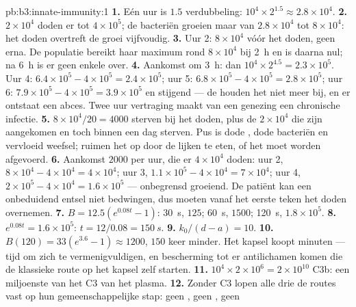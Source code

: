 \begin{solution}{pb:b3:innate-immunity:1}
\textbf{1.} Eén uur is $1.5$ verdubbeling: $10^{4}\times 2^{1.5} \approx
2.8\times 10^{4}$.
\textbf{2.} $2\times 10^{4}$  doden er tot $4\times 10^{5}$;
de bacteriën groeien maar van $2.8\times 10^{4}$ tot $8\times 10^{4}$:
het doden overtreft de groei vijfvoudig.
\textbf{3.} Uur 2: $8\times 10^{4}$ vóór het doden, geen erna. De
populatie bereikt haar maximum rond $8\times 10^{4}$ bij \qty{2}{h} en
is daarna nul; na \qty{6}{h} is er geen enkele over.
\textbf{4.} Aankomst om \qty{3}{h}: dan $10^{4}\times 2^{4.5} = 2.3\times
10^{5}$. Uur 4: $6.4\times 10^{5} - 4\times 10^{5} = 2.4\times
10^{5}$; uur 5: $6.8\times 10^{5} - 4\times 10^{5} = 2.8\times 10^{5}$;
uur 6: $7.9\times 10^{5} - 4\times 10^{5} = 3.9\times 10^{5}$ en
stijgend --- de  houden het niet meer bij, en er ontstaat
een abces. Twee uur vertraging maakt van een genezing een chronische
infectie.
\textbf{5.} $8\times 10^{4}/20 = 4000$  sterven bij het
doden, plus de $2\times 10^{4}$ die zijn aangekomen en toch binnen een
dag sterven. Pus is dode , dode bacteriën en vervloeid
weefsel;  ruimen het op door de lijken te eten, of het moet
worden afgevoerd.
\textbf{6.} Aankomst $2000$ per uur, die er $4\times 10^{4}$ doden: uur
2, $8\times 10^{4} - 4\times 10^{4} = 4\times 10^{4}$; uur 3, $1.1\times
10^{5} - 4\times 10^{4} = 7\times 10^{4}$; uur 4, $2\times 10^{5} -
4\times 10^{4} = 1.6\times 10^{5}$ --- onbegrensd groeiend. De patiënt
kan een onbeduidend entsel niet bedwingen, dus moeten  vanaf
het eerste teken het doden overnemen.
\textbf{7.} $B = 12.5(e^{0.08t} - 1)$: \qty{30}{s}, $125$; \qty{60}{s},
$1500$; \qty{120}{s}, $1.8\times 10^{5}$.
\textbf{8.} $e^{0.08t} = 1.6\times 10^{5}$: $t = 12/0.08 = \qty{150}{s}$.
\textbf{9.} $k_{0}/(d - a) = 10$.
\textbf{10.} $B(120) = 33(e^{3.6} - 1) \approx 1200$, $150$ keer minder.
Het kapsel koopt minuten --- tijd om zich te vermenigvuldigen, en
bescherming tot er antilichamen komen die de klassieke route op het
kapsel zelf starten.
\textbf{11.} $10^{4}\times 2\times 10^{6} = 2\times 10^{10}$ C3b: een
miljoenste van het C3 van het plasma.
\textbf{12.} Zonder C3 lopen alle drie de routes vast op hun
gemeenschappelijke stap: geen , geen , geen

\end{solution}
